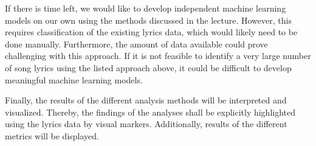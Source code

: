 If there is time left, we would like to develop independent machine learning models on our own using the methods discussed in the lecture. However, this requires classification of the existing lyrics data, which would likely need to be done manually. Furthermore, the amount of data available could prove challenging with this approach. If it is not feasible to identify a very large number of song lyrics using the listed approach above, it could be difficult to develop meaningful machine learning models.

Finally, the results of the different analysis methods will be interpreted and visualized. Thereby, the findings of the analyses shall be explicitly highlighted using the lyrics data by visual markers. Additionally, results of the different metrics will be displayed. 